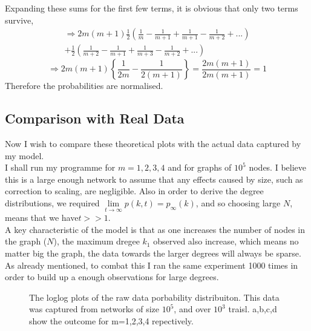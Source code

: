 \documentclass[]{article}
\begin{document}
Expanding these sums for the first few terms, it is obvious that only two terms survive,
\begin{multline*}
 \Rightarrow 2m(m+1)\frac{1}{2}\left(\frac{1}{m}- \frac{1}{m+1}+ \frac{1}{m+1} - \frac{1}{m+2} + ... \right)\\
 + \frac{1}{2}\left( \frac{1}{m+2}- \frac{1}{m+1}+ \frac{1}{m+3} - \frac{1}{m+2} + ... \right)
 \end{multline*}
\begin{equation}
\Rightarrow 2m(m+1)\left\{\frac{1}{2m} - \frac{1}{2(m+1)}\right\}=\frac{2m(m+1)}{2m(m+1)}=1
\end{equation}
Therefore the probabilities are normalised.
\subsection{Comparison with Real Data}
Now I wish to compare these theoretical plots with the actual data captured by my model.\\
I shall run my programme for $m=1,2,3,4$ and for graphs of $10^5$ nodes. I believe this is a large enough network to assume that any effects caused by size, such as correction to scaling, are negligible. Also in order to derive the degree distributions, we required  $ \lim\limits_{t \rightarrow \infty}p(k,t) = p_{\infty}(k)$, and so choosing large $N$, means that we have$t>>1$.\\
 A key characteristic of the model is that as one increases the number of nodes in the graph ($N$), the maximum dregee $k_1$ observed also increase, which means no matter big the graph, the data towards the larger degrees will always be sparse. As already mentioned, to combat this I ran the same experiment 1000 times in order to build up a enough observations for large degrees.\\
 \begin{figure}[htbp]
 		\baselineskip
 	\caption{The loglog plots of the raw data porbability distribuiton. This data was captured from networks of size $10^5$, and over $10^3$ traisl. a,b,c,d show the outcome for m=1,2,3,4 repectively.}
\end{figure}
\end{document}

